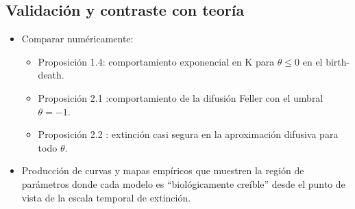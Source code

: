 \documentclass[12pt,]{article}
\begin{document}
\subsection{Validación y contraste con teoría}
\begin{itemize}
    \item Comparar numéricamente:
    \begin{itemize}
        \item Proposición 1.4: comportamiento exponencial en K para $\theta\le 0$ en el birth-death.
        \item Proposición 2.1 :comportamiento de la difusión Feller con el umbral $\theta=-1$.
        \item Proposición 2.2 : extinción casi segura en la aproximación difusiva para todo $\theta$.
    \end{itemize}
    \item Producción de curvas y mapas empíricos que muestren la región de parámetros donde cada modelo es “biológicamente creíble” desde el punto de vista de la escala temporal de extinción.
\end{itemize}


\newpage\clearpage


% 
\end{document}
